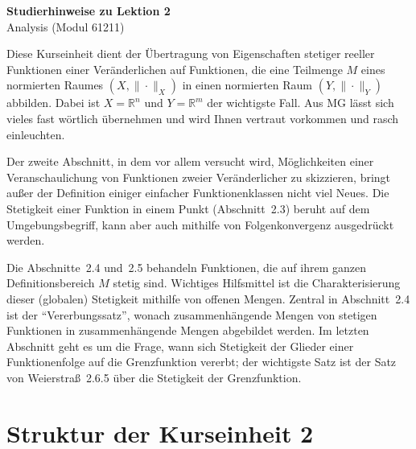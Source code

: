\documentclass[a4paper,12pt]{article}
\begin{document}
\begin{center}
  {\LARGE\bfseries Studierhinweise zu Lektion 2}\\[0.5em]
  {\large Analysis (Modul 61211)}
\end{center}

\vspace{1em}

Diese Kurseinheit dient der Übertragung von Eigenschaften stetiger reeller Funktionen
einer Veränderlichen auf Funktionen, die eine Teilmenge $M$ eines normierten Raumes
$(X, \|\cdot\|_X)$ in einen normierten Raum $(Y, \|\cdot\|_Y)$ abbilden. Dabei ist
$X = \mathbb{R}^n$ und $Y = \mathbb{R}^m$ der wichtigste Fall. Aus MG lässt sich
vieles fast wörtlich übernehmen und wird Ihnen vertraut vorkommen und rasch einleuchten.

Der zweite Abschnitt, in dem vor allem versucht wird, Möglichkeiten einer Veranschaulichung
von Funktionen zweier Veränderlicher zu skizzieren, bringt außer der Definition einiger
einfacher Funktionenklassen nicht viel Neues. Die Stetigkeit einer Funktion in einem
Punkt (Abschnitt~2.3) beruht auf dem Umgebungsbegriff, kann aber auch mithilfe von
Folgenkonvergenz ausgedrückt werden.

Die Abschnitte~2.4 und~2.5 behandeln Funktionen, die auf ihrem ganzen Definitionsbereich
$M$ stetig sind. Wichtiges Hilfsmittel ist die Charakterisierung dieser (globalen)
Stetigkeit mithilfe von offenen Mengen. Zentral in Abschnitt~2.4 ist der
"`Vererbungssatz"', wonach zusammenhängende Mengen von stetigen Funktionen in
zusammenhängende Mengen abgebildet werden. Im letzten Abschnitt geht es um die Frage,
wann sich Stetigkeit der Glieder einer Funktionenfolge auf die Grenzfunktion vererbt;
der wichtigste Satz ist der Satz von Weierstraß~2.6.5 über die Stetigkeit der
Grenzfunktion.

\section*{Struktur der Kurseinheit 2}
\end{document}
